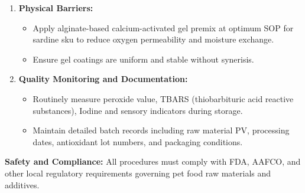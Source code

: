 \begin{enumerate}
  \item \textbf{Physical Barriers:}  
  \begin{itemize}
    \item Apply alginate-based calcium-activated gel premix at optimum SOP for sardine sku to reduce oxygen permeability and moisture exchange.  
    \item Ensure gel coatings are uniform and stable without synerisis.
  \end{itemize}

  \item \textbf{Quality Monitoring and Documentation:}  
  \begin{itemize}
    \item Routinely measure peroxide value, TBARS (thiobarbituric acid reactive substances), Iodine and sensory indicators during storage.  
    \item Maintain detailed batch records including raw material PV, processing dates, antioxidant lot numbers, and packaging conditions.
  \end{itemize}
\end{enumerate}

\textbf{Safety and Compliance:}  
All procedures must comply with FDA, AAFCO, and other local regulatory requirements governing pet food raw materials and additives.

\vspace{0.5em}


